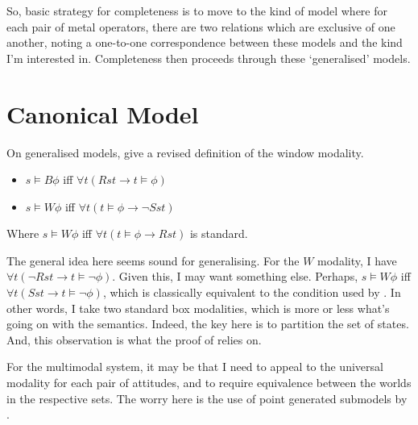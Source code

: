 \documentclass[10pt]{article}
\makeatletter
\renewcommand\lbrack[1][]{\ooalign{\ensuremath{#1\lfloor}\cr\ensuremath{#1\lceil}}}
\renewcommand\rbrack[1][]{\ooalign{\ensuremath{#1\rfloor}\cr\ensuremath{#1\rceil}}}
\newcommand{\llbrack}[1][]{\savebox{\@bry}{\(\m@th{#1\lbrack}\)}%
  \mathopen{\usebox{\@bry}\kern-0.7\wd\@bry\usebox{\@bry}}}
\newcommand{\rrbrack}[1][]{\savebox{\@bry}{\(\m@th{#1\rbrack}\)}%
  \mathclose{\usebox{\@bry}\kern-0.7\wd\@bry\usebox{\@bry}}}
\newcommand{\sem}[1]{\ensuremath{\llbrack{#1}\rrbrack}}
\makeatother
\begin{document}

So, basic strategy for completeness is to move to the kind of model where for each pair of metal operators, there are two relations which are exclusive of one another, noting a one-to-one correspondence between these models and the kind I'm interested in.
Completeness then proceeds through these `generalised' models.



\section{Canonical Model}
\label{sec:canonical-model}

On generalised models, \citeauthor{Gargov:1987aa} give a revised definition of the window modality.

\begin{itemize}
\item \(s \vDash B\phi\) iff \(\forall t(Rst \rightarrow t \vDash \phi)\)
\item \(s \vDash W\phi\) iff \(\forall t(t \vDash \phi \rightarrow \lnot Sst)\)
\end{itemize}

Where \(s \vDash W\phi\) iff \(\forall t(t \vDash \phi \rightarrow Rst)\) is standard.

The general idea here seems sound for generalising.
For the \(W\) modality, I have \(\forall t(\lnot Rst \rightarrow t \vDash \lnot\phi)\).
Given this, I may want something else.
Perhaps, \(s \vDash W\phi \) iff \(\forall t(Sst \rightarrow t \vDash \lnot\phi)\), which is classically equivalent to the condition used by \citeauthor{Gargov:1987aa}.
In other words, I take two standard box modalities, which is more or less what's going on with the semantics.
Indeed, the key here is to partition the set of states.
And, this observation is what the proof of \citeauthor{Gargov:1987aa} relies on.

For the multimodal system, it may be that I need to appeal to the universal modality for each pair of attitudes, and to require equivalence between the worlds in the respective sets.
The worry here is the use of point generated submodels by \citeauthor{Gargov:1987aa}.
\end{document}
